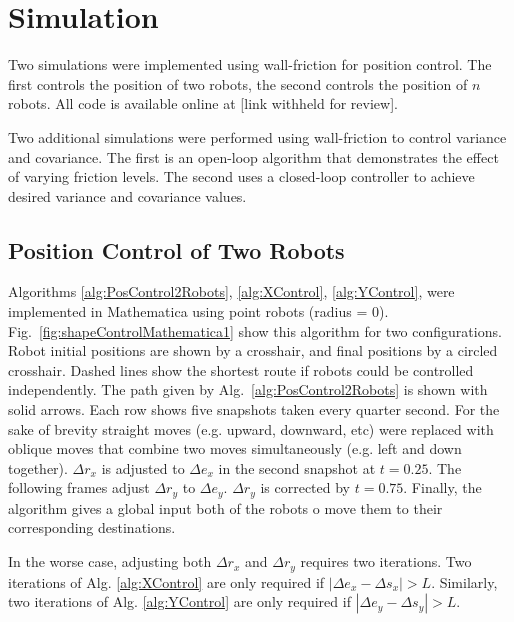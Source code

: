 
\section{Simulation}\label{sec:simulation}

Two simulations were implemented using wall-friction for position control.  The first controls the position of two robots, the second controls the position of $n$ robots.  All code is available online at [link withheld for review].

Two additional simulations were performed using wall-friction to control variance and covariance.  The first is an open-loop algorithm that demonstrates the effect of varying friction levels.  The second uses a closed-loop controller to achieve desired variance and covariance values.



\subsection{Position Control of Two Robots}

Algorithms \ref{alg:PosControl2Robots}, \ref{alg:XControl}, \ref{alg:YControl}, were implemented in Mathematica using point robots (radius = $0$).  Fig.~\ref{fig:shapeControlMathematica1}  show  this algorithm for two configurations. 
Robot initial positions are shown by a crosshair, and final positions by a circled crosshair.  Dashed lines show the shortest route if robots could be controlled independently.  The path given by  Alg.\ \ref{alg:PosControl2Robots} is shown with solid arrows.
Each row shows five snapshots taken every quarter second. For the sake of brevity straight moves (e.g. upward, downward, etc) were replaced with oblique moves that combine two moves simultaneously (e.g. left and down together). 
 $\Delta r_x$ is adjusted to $\Delta e_x$ in the second snapshot at $t = 0.25$. 
 The following frames  adjust $\Delta r_y$ to $\Delta e_y$. 
 $\Delta r_y$ is corrected by $t = 0.75$. 
 Finally, the algorithm gives a global input both of the robots o move them to their corresponding destinations.

In the worse case, adjusting both $\Delta r_x$ and $\Delta r_y$ requires two iterations.   Two iterations of Alg. \ref{alg:XControl} are only required if $|\Delta e_x - \Delta s_x|>L$. 
Similarly,  two iterations of Alg. \ref{alg:YControl} are only required if $|\Delta e_y - \Delta s_y|>L$.









